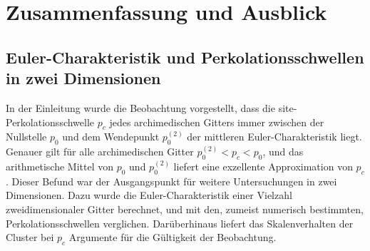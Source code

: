 
\chapter{Zusammenfassung und Ausblick}
\label{sec:zusammenfassung}


\section*{Euler-Charakteristik und Perkolationsschwellen in zwei Dimensionen}
In der Einleitung wurde die Beobachtung vorgestellt, dass die site-Perkolationsschwelle $p_c$ jedes archimedischen Gitters immer zwischen der Nullstelle $p_0$ und dem Wendepunkt $p_0^{(2)}$ der mittleren Euler-Charakteristik liegt. Genauer gilt f\"ur alle archimedischen Gitter $p_0^{(2)}<p_c<p_0$, und das arithmetische Mittel von $p_0$ und $p_0^{(2)}$ liefert eine exzellente Approximation von $p_c$. Dieser Befund war der Ausgangspunkt f\"ur weitere Untersuchungen in zwei Dimensionen. Dazu wurde die Euler-Charakteristik einer Vielzahl zweidimensionaler Gitter berechnet, und mit den, zumeist numerisch bestimmten, Perkolationsschwellen verglichen. Dar\"uberhinaus liefert das Skalenverhalten der Cluster bei $p_c$ Argumente f\"ur die G\"ultigkeit der Beobachtung.
